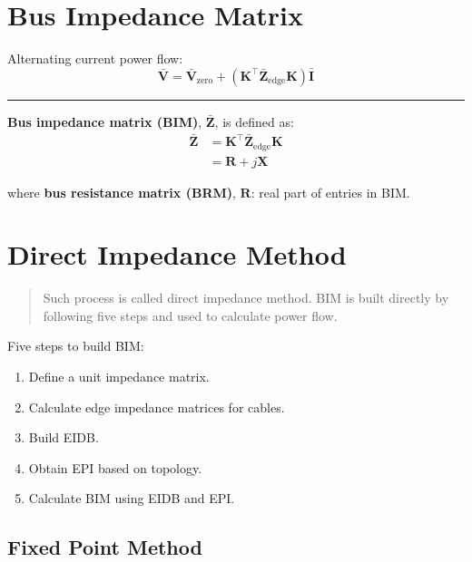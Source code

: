 \documentclass[
]{book}
\providecommand{\tightlist}{%
  \setlength{\itemsep}{0pt}\setlength{\parskip}{0pt}}
\begin{document}
\hypertarget{BIM}{%
\section{Bus Impedance Matrix}\label{BIM}}

Alternating current power flow:
\[
  \bar{\boldsymbol{V}} = \bar{\boldsymbol{V}}_{\text{zero}}
    + \left( \boldsymbol{K}^{\top} \boldsymbol{\bar{Z}}_\text{edge}
    \boldsymbol{K} \right) \bar{\boldsymbol{I}}
\]

\begin{center}\rule{0.5\linewidth}{0.5pt}\end{center}

\textbf{Bus impedance matrix (BIM)}, \(\boldsymbol{\bar{Z}}\), is defined as:
\[ \begin{aligned}
  \boldsymbol{\bar{Z}}
    &= \boldsymbol{K}^{\top} \boldsymbol{\bar{Z}}_\text{edge}
    \boldsymbol{K} \\
    &= \boldsymbol{R} + j \boldsymbol{X}
\end{aligned} \]

where \textbf{bus resistance matrix (BRM)}, \(\boldsymbol{R}\): real part of entries
in BIM.

\hypertarget{power-flow}{%
\section{Direct Impedance Method}\label{power-flow}}

\begin{quote}
Such process is called direct impedance method. BIM is built directly by
following five steps and used to calculate power flow.
\end{quote}

Five steps to build BIM:

\begin{enumerate}
\def\labelenumi{\arabic{enumi}.}
\tightlist
\item
  Define a unit impedance matrix.
\item
  Calculate edge impedance matrices for cables.
\item
  Build EIDB.
\item
  Obtain EPI based on topology.
\item
  Calculate BIM using EIDB and EPI.
\end{enumerate}

\hypertarget{fixed-point-method}{%
\subsection*{Fixed Point Method}\label{fixed-point-method}}
\end{document}
